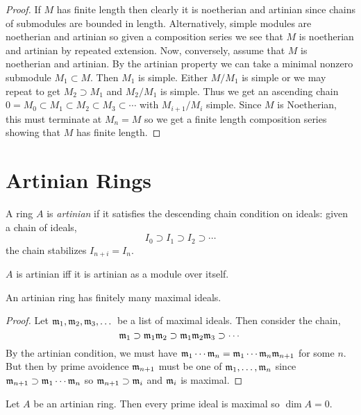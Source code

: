 \documentclass[12pt]{article}
\begin{document}
\begin{proof}
If $M$ has finite length then clearly it is noetherian and artinian since chains of submodules are bounded in length. Alternatively, simple modules are noetherian and artinian  so given a composition series we see that $M$ is noetherian and artinian by repeated extension. Now, conversely, assume that $M$ is noetherian and artinian. By the artinian property we can take a minimal nonzero submodule $M_1 \subset M$. Then $M_1$ is simple. Either $M / M_1$ is simple or we may repeat to get $M_2 \supset M_1$ and $M_2 / M_1$ is simple. Thus we get an ascending chain $0 = M_0 \subset M_1 \subset M_2 \subset M_3 \subset  \cdots$ with $M_{i+1}/M_i$ simple. Since $M$ is Noetherian, this must terminate at $M_n = M$ so we get a finite length composition series showing that $M$ has finite length.
\end{proof}

\section{Artinian Rings}

\begin{defn}
A ring $A$ is \textit{artinian} if it satisfies the descending chain condition on ideals: given a chain of ideals,
\[ I_0 \supset I_1 \supset I_2 \supset \cdots \]
the chain stabilizes $I_{n+i} = I_n$. 
\end{defn}

\begin{rmk}
$A$ is artinian iff it is artinian as a module over itself.
\end{rmk}

\begin{prop}
An artinian ring has finitely many maximal ideals.
\end{prop}

\begin{proof}
Let $\mathfrak{m}_1, \mathfrak{m}_2, \mathfrak{m}_3, \dots$ be a list of maximal ideals. Then consider the chain,
\[ \mathfrak{m}_1 \supset \mathfrak{m}_1 \mathfrak{m}_2 \supset \mathfrak{m}_1 \mathfrak{m}_2 \mathfrak{m}_3 \supset \cdots \]
By the artinian condition, we must have $\mathfrak{m}_1 \cdots \mathfrak{m}_n = \mathfrak{m}_1 \cdots \mathfrak{m}_n \mathfrak{m}_{n+1}$ for some $n$. But then by prime avoidence $\mathfrak{m}_{n+1}$ must be one of $\mathfrak{m}_1, \dots, \mathfrak{m}_n$ since $\mathfrak{m}_{n+1} \supset \mathfrak{m}_1 \cdots \mathfrak{m}_n$ so $\mathfrak{m}_{n+1} \supset \mathfrak{m}_i$ and $\mathfrak{m}_i$ is maximal.
\end{proof}



\begin{prop}
Let $A$ be an artinian ring. Then every prime ideal is maximal so $\dim{A} = 0$.
\end{prop}
\end{document}

